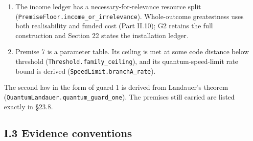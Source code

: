\documentclass[
]{article}
\begin{document}
\begin{enumerate}
\item
  The income ledger has a necessary-for-relevance resource split
  (\texttt{P\allowbreak{}r\allowbreak{}e\allowbreak{}m\allowbreak{}i\allowbreak{}s\allowbreak{}e\allowbreak{}F\allowbreak{}l\allowbreak{}o\allowbreak{}o\allowbreak{}r\allowbreak{}.\allowbreak{}i\allowbreak{}n\allowbreak{}c\allowbreak{}o\allowbreak{}m\allowbreak{}e\allowbreak{}\_\allowbreak{}o\allowbreak{}r\allowbreak{}\_\allowbreak{}i\allowbreak{}r\allowbreak{}r\allowbreak{}e\allowbreak{}l\allowbreak{}e\allowbreak{}v\allowbreak{}a\allowbreak{}n\allowbreak{}c\allowbreak{}e}).
  Whole-outcome greatestness uses both realisability and funded cost
  (Part II.10); G2 retains the full construction and Section 22 states
  the installation ledger.
\item
  Premise 7 is a parameter table. Its ceiling is met at some code
  distance below threshold
  (\texttt{T\allowbreak{}h\allowbreak{}r\allowbreak{}e\allowbreak{}s\allowbreak{}h\allowbreak{}o\allowbreak{}l\allowbreak{}d\allowbreak{}.\allowbreak{}f\allowbreak{}a\allowbreak{}m\allowbreak{}i\allowbreak{}l\allowbreak{}y\allowbreak{}\_\allowbreak{}c\allowbreak{}e\allowbreak{}i\allowbreak{}l\allowbreak{}i\allowbreak{}n\allowbreak{}g}),
  and its quantum-speed-limit rate bound is derived
  (\texttt{S\allowbreak{}p\allowbreak{}e\allowbreak{}e\allowbreak{}d\allowbreak{}L\allowbreak{}i\allowbreak{}m\allowbreak{}i\allowbreak{}t\allowbreak{}.\allowbreak{}b\allowbreak{}r\allowbreak{}a\allowbreak{}n\allowbreak{}c\allowbreak{}h\allowbreak{}A\allowbreak{}\_\allowbreak{}r\allowbreak{}a\allowbreak{}t\allowbreak{}e}).
\end{enumerate}

The second law in the form of guard 1 is derived from Landauer's theorem
(\texttt{Q\allowbreak{}u\allowbreak{}a\allowbreak{}n\allowbreak{}t\allowbreak{}u\allowbreak{}m\allowbreak{}L\allowbreak{}a\allowbreak{}n\allowbreak{}d\allowbreak{}a\allowbreak{}u\allowbreak{}e\allowbreak{}r\allowbreak{}.\allowbreak{}q\allowbreak{}u\allowbreak{}a\allowbreak{}n\allowbreak{}t\allowbreak{}u\allowbreak{}m\allowbreak{}\_\allowbreak{}g\allowbreak{}u\allowbreak{}a\allowbreak{}r\allowbreak{}d\allowbreak{}\_\allowbreak{}o\allowbreak{}n\allowbreak{}e}).
The premises still carried are listed exactly in §23.8.

\subsection{I.3 Evidence conventions}\label{i.3-evidence-conventions}
\end{document}
